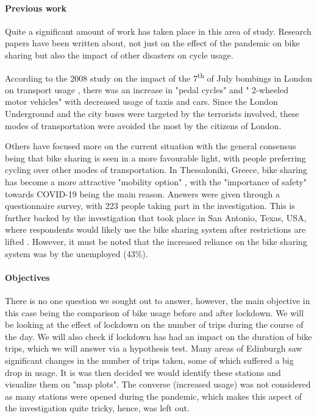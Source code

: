 \documentclass[11pt,a4paper]{article}
\begin{document}
\paragraph{Previous work}
Quite a significant amount of work has taken place in this area of study. Research papers have been written about, not just on the effect of the pandemic on bike sharing but also the impact of other disasters on cycle usage. 
\par
According to the 2008 study on the impact of the 7\textsuperscript{th} of July bombings in London on transport usage \cite{london_bombing}, there was an increase in "pedal cycles" and " 2-wheeled  motor  vehicles" with decreased usage of taxis and cars. Since the London Underground and the city buses were targeted by the terrorists involved, these modes of transportation were avoided the most by the citizens of London.
\par
Others have focused more on the current situation with the general consensus being that bike sharing is seen in a more favourable light, with people preferring cycling over other modes of transportation. In Thessaloniki, Greece, bike sharing has become a more attractive "mobility option" \cite{greece_covid}, with the "importance of safety" towards COVID-19 being the main reason. Answers were given through a questionnaire survey, with 223 people taking part in the investigation. This is further backed by the investigation that took place in San Antonio, Texas, USA, where respondents would likely use the bike sharing system after restrictions are lifted \cite{texas_covid}. However, it must be noted that the increased reliance on the bike sharing system was by the unemployed (43\%).
\vspace{-4mm}
\paragraph{Objectives}
There is no one question we sought out to answer, however, the main objective in this case being the comparison of bike usage before and after lockdown. We will be looking at the effect of lockdown on the number of trips during the course of the day. We will also check if lockdown has had an impact on the duration of bike trips, which we will answer via a hypothesis test. Many areas of Edinburgh saw significant changes in the number of trips taken, some of which suffered a big drop in usage. It is was then decided we would identify these stations and visualize them on "map plots". The converse (increased usage) was not considered as many stations were opened during the pandemic, which makes this aspect of the investigation quite tricky, hence, was left out. 
\end{document}
